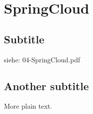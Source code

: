 \section{SpringCloud}

\subsection{Subtitle}

siehe: 04-SpringCloud.pdf

\subsection{Another subtitle}

More plain text.
